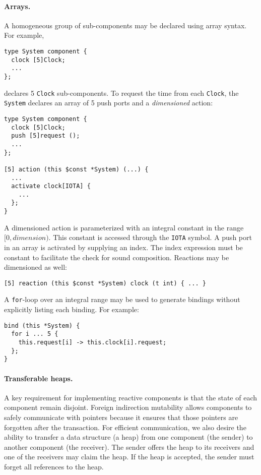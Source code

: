 \paragraph{Arrays.}
A homogeneous group of sub-components may be declared using array syntax.
For example,
\begin{verbatim}
type System component {
  clock [5]Clock;
  ...
};
\end{verbatim}
declares 5 \verb+Clock+ sub-components.
To request the time from each \verb+Clock+, the \verb+System+ declares an array of 5 push ports and a \emph{dimensioned} action:
\begin{verbatim}
type System component {
  clock [5]Clock;
  push [5]request ();
  ...
};

[5] action (this $const *System) (...) {
  ...
  activate clock[IOTA] {
    ...
  };
}
\end{verbatim}
A dimensioned action is parameterized with an integral constant in the range $[0,dimension)$.
This constant is accessed through the \verb+IOTA+ symbol.
A push port in an array is activated by supplying an index.
The index expression must be constant to facilitate the check for sound composition.
Reactions may be dimensioned as well:
\begin{verbatim}
[5] reaction (this $const *System) clock (t int) { ... }
\end{verbatim}
A \verb+for+-loop over an integral range may be used to generate bindings without explicitly listing each binding.
For example:
\begin{verbatim}
bind (this *System) {
  for i ... 5 {
    this.request[i] -> this.clock[i].request;
  };
}
\end{verbatim}

\paragraph{Transferable heaps.}
A key requirement for implementing reactive components is that the state of each component remain disjoint.
Foreign indirection mutability allows components to safely communicate with pointers because it ensures that those pointers are forgotten after the transaction.
For efficient communication, we also desire the ability to transfer a data structure (a heap) from one component (the sender) to another component (the receiver).
The sender offers the heap to its receivers and one of the receivers may claim the heap.
If the heap is accepted, the sender must forget all references to the heap.

